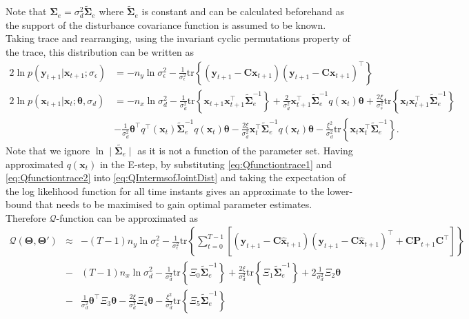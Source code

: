 \documentclass[]{article}
\begin{document}
Note that $\boldsymbol\Sigma_e=\sigma_d^2\tilde{\boldsymbol\Sigma}_e$ where $\tilde{\boldsymbol\Sigma}_e$ is constant and can be calculated beforehand as the support of the disturbance covariance function is assumed to be known. Taking trace and rearranging, using the invariant cyclic permutations property of the trace, this distribution can be written as
\begin{align}\label{eq:Qfunctiontrace1}
  2\ln p\left(\mathbf y_{t+1}|\mathbf x_{t+1};\sigma_{\epsilon}\right) &= -n_y\ln \sigma_{\epsilon}^2-\frac{1}{\sigma_{\epsilon}^2}\mathrm{tr}\left\lbrace(\mathbf y_{t+1}-\mathbf C\mathbf  x_{t+1}) (\mathbf y_{t+1}-\mathbf C\mathbf  x_{t+1})^\top\right\rbrace    \\
 2 \ln p(\mathbf x_{t+1}|\mathbf x_{t};\boldsymbol \theta ,\sigma_d) &=-n_x\ln\sigma_d^2-\frac{1}{\sigma_d^2}\mathrm{tr}\left\lbrace\mathbf x_{t+1} \mathbf x_{t+1}^\top\tilde{\boldsymbol\Sigma}_e^{-1}\right\rbrace+\frac{2}{\sigma_d^2}\mathbf x_{t+1}^\top\tilde{\boldsymbol\Sigma}_e^{-1}q( \mathbf x_t)\boldsymbol\theta+\frac{2\xi}{\sigma_s^2} \mathrm{tr} \left\lbrace \mathbf x_t\mathbf x_{t+1}^\top\tilde{\boldsymbol\Sigma}_e^{-1}\right\rbrace \nonumber \\
&-\frac{1}{\sigma_d^2}\boldsymbol\theta^\top q^\top(\mathbf x_t)\tilde{\boldsymbol\Sigma}_e^{-1}q(\mathbf x_t)\boldsymbol\theta-\frac{2\xi}{\sigma_d^2} \mathbf x_t^\top\tilde{\boldsymbol\Sigma}_e^{-1}q(\mathbf x_t)\boldsymbol\theta-\frac{\xi^2}{\sigma_d^2}\mathrm{tr}\left\lbrace \mathbf x_t \mathbf x_t^\top\tilde{\boldsymbol\Sigma}_e^{-1}\right\rbrace. \label{eq:Qfunctiontrace2}
\end{align}
Note that we ignore $\ln\mid\tilde{\boldsymbol\Sigma_e}\mid $ as it is not a function of the parameter set. Having approximated $q\left(\mathbf x_t\right)$ in the E-step, by substituting  \ref{eq:Qfunctiontrace1} and \ref{eq:Qfunctiontrace2} into \ref{eq:QIntermsofJointDist} and taking the expectation of the log likelihood function for all time instants gives an approximate to the lower-bound that needs to be maximised to gain optimal parameter estimates. Therefore $\mathcal Q$-function can be approximated as  
\begin{eqnarray}\label{eq:Voldermont}
 \mathcal Q(\boldsymbol \Theta,\boldsymbol\Theta')&\approx& -(T-1)n_y\ln \sigma_{\epsilon}^2-\frac{1}{\sigma_{\epsilon}^2}\mathrm{tr}\left\lbrace\boldsymbol\sum_{t=0}^{T-1}\left[ (\mathbf y_{t+1}-\mathbf C\mathbf{\hat{x}}_{t+1}) (\mathbf y_{t+1}-\mathbf C\mathbf{\hat{x}}_{t+1})^\top+\mathbf C \mathbf P_{t+1}\mathbf C^\top\right] \right\rbrace\nonumber \\
&-&(T-1)n_x\ln\sigma_d^2-\frac{1}{\sigma_d^2}\mathrm{tr}\left\lbrace \Xi_{0} \tilde{\boldsymbol\Sigma}_e^{-1}\right\rbrace +\frac{2\xi}{\sigma_d^2} \mathrm{tr}\left\lbrace \Xi_{1} \tilde{\boldsymbol\Sigma}_e^{-1}\right\rbrace+2\frac{1}{\sigma_d^2}\Xi_{2}\boldsymbol\theta
 \nonumber \\
&-&\frac{1}{\sigma_d^2}\boldsymbol\theta^\top \Xi_{3}\boldsymbol\theta-\frac{2\xi}{\sigma_d^2} \Xi_{4} \boldsymbol\theta -  \frac{\xi^2}{\sigma_d^2}\mathrm{tr} \left\lbrace\Xi_{5}\tilde{\boldsymbol\Sigma}_e^{-1} \right\rbrace 
\end{eqnarray}
\end{document}
